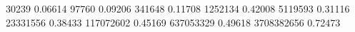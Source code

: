 30239       0.06614
97760       0.09206
341648      0.11708
1252134     0.42008
5119593     0.31116
23331556    0.38433
117072602   0.45169
637053329   0.49618
3708382656  0.72473